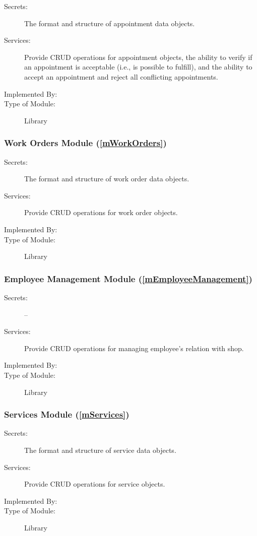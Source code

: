 \documentclass[12pt, titlepage]{article}
\begin{document}
\begin{description}
	\item[Secrets:] The format and structure of appointment data objects.
	\item[Services:] Provide CRUD operations for appointment objects, the ability to verify if an appointment
		is acceptable (i.e., is possible to fulfill), and the ability to accept an appointment and reject
		all conflicting appointments.
	\item[Implemented By:] \progname{}
	\item[Type of Module:] Library
\end{description}

\subsubsection{Work Orders Module (\ref{mWorkOrders})}

\begin{description}
	\item[Secrets:] The format and structure of work order data objects.
	\item[Services:] Provide CRUD operations for work order objects.
	\item[Implemented By:] \progname{}
	\item[Type of Module:] Library
\end{description}

\subsubsection{Employee Management Module (\ref{mEmployeeManagement})}

\begin{description}
	\item[Secrets:] --
	\item[Services:] Provide CRUD operations for managing employee's relation with shop.
	\item[Implemented By:] \progname{}
	\item[Type of Module:] Library
\end{description}

\subsubsection{Services Module (\ref{mServices})}

\begin{description}
	\item[Secrets:] The format and structure of service data objects.
	\item[Services:] Provide CRUD operations for service objects.
	\item[Implemented By:] \progname{}
	\item[Type of Module:] Library
\end{description}
\end{document}
